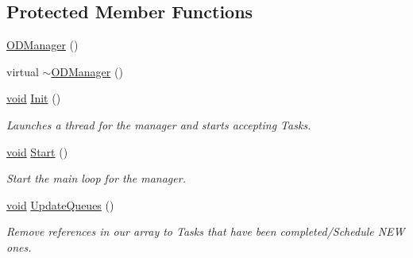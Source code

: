 \subsection*{Protected Member Functions}
\begin{DoxyCompactItemize}
\item 
\hyperlink{class_o_d_manager_a569b8321db46a87f1c58cfd8c13815b2}{O\+D\+Manager} ()
\item 
virtual \hyperlink{class_o_d_manager_a2de62c7730945c4fcc4f62c164c442d8}{$\sim$\+O\+D\+Manager} ()
\item 
\hyperlink{sound_8c_ae35f5844602719cf66324f4de2a658b3}{void} \hyperlink{class_o_d_manager_a2347e6e64f43bae20e12ce2f467a2ce0}{Init} ()
\begin{DoxyCompactList}\small\item\em Launches a thread for the manager and starts accepting Tasks. \end{DoxyCompactList}\item 
\hyperlink{sound_8c_ae35f5844602719cf66324f4de2a658b3}{void} \hyperlink{class_o_d_manager_a4709915d78781ebba4489e74b7d30170}{Start} ()
\begin{DoxyCompactList}\small\item\em Start the main loop for the manager. \end{DoxyCompactList}\item 
\hyperlink{sound_8c_ae35f5844602719cf66324f4de2a658b3}{void} \hyperlink{class_o_d_manager_a6d8e8b5263068d7c19f3be1a4fa2d6e9}{Update\+Queues} ()
\begin{DoxyCompactList}\small\item\em Remove references in our array to Tasks that have been completed/\+Schedule N\+EW ones. \end{DoxyCompactList}\end{DoxyCompactItemize}
